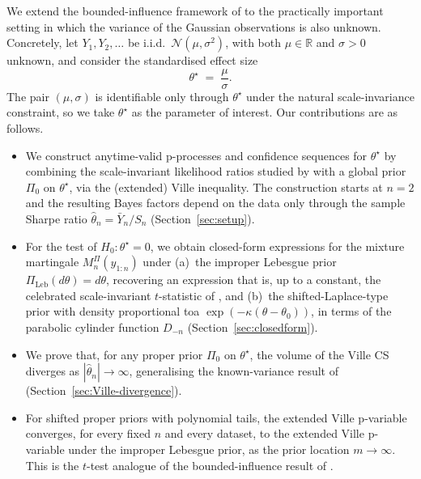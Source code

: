 \documentclass{article}%
\newcommand{\R}{\mathbb{R}}
\newcommand{\Leb}{\mathrm{Leb}}
\begin{document}
We extend the bounded-influence framework of \cite{Cortinovis2025} to
the practically important setting in which the variance of the
Gaussian observations is also unknown. Concretely, let
\(Y_1,Y_2,\ldots\) be i.i.d.\ \(\mathcal N(\mu,\sigma^2)\), with both
\(\mu\in\R\) and \(\sigma>0\) unknown, and consider the standardised
effect size
\[
   \theta^\star \;=\; \frac{\mu}{\sigma}.
\]
The pair \((\mu,\sigma)\) is identifiable only through
\(\theta^\star\) under the natural scale-invariance constraint, so we
take \(\theta^\star\) as the parameter of interest. Our contributions
are as follows.

\begin{itemize}
    \item We construct anytime-valid p-processes
and confidence sequences for \(\theta^\star\) by combining the
scale-invariant likelihood ratios studied by
\cite{Lai1976,PerezOrtiz2024,Wang2025} with a global prior
\(\Pi_0\) on \(\theta^\star\), via the (extended) Ville inequality.
The construction starts at \(n=2\) and the resulting Bayes factors
depend on the data only through the sample Sharpe ratio
\(\widehat\theta_n=\bar Y_n/S_n\) (Section~\ref{sec:setup}).

\item For the test of
\(H_0:\theta^\star=0\), we obtain closed-form expressions for the
mixture martingale \(M_n^\Pi(y_{1:n})\) under (a)~the improper
Lebesgue prior \(\Pi_{\Leb}(d\theta)=d\theta\), recovering an
expression that is, up to a constant, the celebrated scale-invariant
\(t\)-statistic of \cite{Lai1976}, and (b)~the
shifted-Laplace-type prior with density proportional toa
\(\exp(-\kappa(\theta-\theta_0))\), in terms of the parabolic
cylinder function \(D_{-n}\) (Section~\ref{sec:closedform}).


\item We prove that,
for any proper prior \(\Pi_0\) on \(\theta^\star\), the
volume of the Ville CS diverges as \(|\widehat\theta_n|\to\infty\),
generalising the known-variance result of
\cite[Theorem 4.1]{Cortinovis2025} (Section~\ref{sec:Ville-divergence}).

\item For shifted
proper priors with polynomial tails, the extended Ville p-variable
converges, for every fixed \(n\) and every dataset, to the
extended Ville p-variable under the improper Lebesgue prior, as the
prior location \(m\to\infty\).
This is the \(t\)-test analogue of the bounded-influence result
of \cite[Theorem 4.3]{Cortinovis2025}.



\end{itemize}
\end{document}
